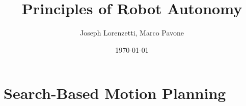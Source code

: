 \documentclass[nohyper,nobib]{tufte-book}
\title{Principles of Robot Autonomy}
\author{Joseph Lorenzetti, Marco Pavone}
\date{\today}
\begin{document}
\chapter{Search-Based Motion Planning}


\printbibliography
\end{document}
